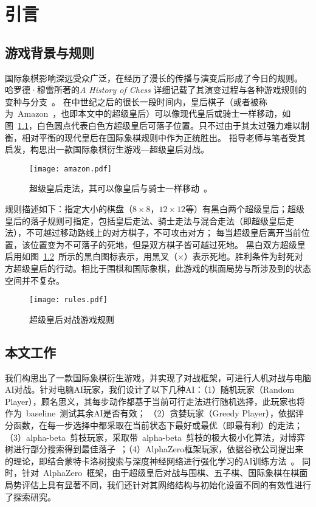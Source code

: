 \chapter{引言}
\label{chap:introduction}

\section{游戏背景与规则}
国际象棋影响深远受众广泛，在经历了漫长的传播与演变后形成了今日的规则。
哈罗德·穆雷所著的\textit{A History of Chess} 详细记载了其演变过程与各种游戏规则的变种与分支~\cite{murray2015history}。
在中世纪之后的很长一段时间内，皇后棋子（或者被称为~Amazon~，也即本文中的超级皇后）可以像现代皇后或骑士一样移动，如图~\ref{fig:superQueen}，白色圆点代表白色方超级皇后可落子位置。只不过由于其太过强力难以制衡，相对平衡的现代皇后在国际象棋规则中作为正统胜出。
指导老师与笔者受其启发，构思出一款国际象棋衍生游戏—超级皇后对战。
\begin{figure}[htb]
  \centering
  \texttt{[image: amazon.pdf]}
  \caption[superQueen]{%
    超级皇后走法，其可以像皇后与骑士一样移动~\cite{wikiAmazon}。}
  \label{fig:superQueen}
\end{figure}
规则描述如下：指定大小的棋盘（$8\times8$，$12\times12$等）有黑白两个超级皇后；超级皇后的落子规则可指定，包括皇后走法、骑士走法与混合走法（即超级皇后走法），不可越过移动路线上的对方棋子，不可攻击对方；
每当超级皇后离开当前位置，该位置变为不可落子的死地，但是双方棋子皆可越过死地。
黑白双方超级皇后用如图~\ref{fig:superQueenRules}~所示的黑白图标表示，用黑叉（$\mathbf{\times}$）表示死地。胜利条件为封死对方超级皇后的行动。相比于围棋和国际象棋，此游戏的棋面局势与所涉及到的状态空间并不复杂。

\begin{figure}[htb]
    \centering
    \texttt{[image: rules.pdf]}
    \caption[superQueenRules]{%
      超级皇后对战游戏规则%
      }
    \label{fig:superQueenRules}
  \end{figure}


\section{本文工作}
我们构思出了一款国际象棋衍生游戏，并实现了对战框架，可进行人机对战与电脑AI对战。针对电脑AI玩家，我们设计了以下几种AI：（1）随机玩家（Random Player），顾名思义，其每步动作都基于当前可行走法进行随机选择，此玩家也将作为~baseline~测试其余AI是否有效；
（2）贪婪玩家（Greedy Player），依据评分函数，在每一步选择中都采取在当前状态下最好或最优（即最有利）的走法；（3）alpha-beta~剪枝玩家，采取带~alpha-beta~剪枝的极大极小化算法，对博弈树进行部分搜索得到最佳落子~\cite{russell2010artificial}；（4）AlphaZero框架玩家，依据谷歌公司提出来的理论，即结合蒙特卡洛树搜索与深度神经网络进行强化学习的AI训练方法~\cite{Silver1140}。
同时，针对~AlphaZero~框架，由于超级皇后对战与围棋、五子棋、国际象棋在棋面局势评估上具有显著不同，我们还针对其网络结构与初始化设置不同的有效性进行了探索研究。

